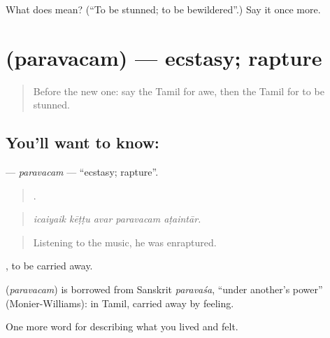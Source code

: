 \begin{tcolorbox}[breakable,colback=teal!4,colframe=teal!35!black,title={Before you move on}]
What does  mean? (\textquotedblleft{}To be stunned; to be bewildered\textquotedblright{}.) Say it once more.
\end{tcolorbox}
\section[\texorpdfstring{\ta{பரவசம்} (paravacam)}{பரவசம் (paravacam)}]{ (paravacam) — ecstasy; rapture}

\label{lesson:TA-C460-paravacam}



\begin{quote}
Before the new one: say the Tamil for awe, then the Tamil for to be stunned.
\end{quote}

\subsection*{You'll want to know: }
\textbf{} — \emph{paravacam} — \textquotedblleft{}ecstasy; rapture\textquotedblright{}.

\begin{quote}
    .
\end{quote}

\begin{quote}
\emph{icaiyaik kēṭṭu avar paravacam aṭaintār.}
\end{quote}

\begin{quote}
Listening to the music, he was enraptured.
\end{quote}

 , to be carried away.

\begin{cousinweb}
\textbf{} (\emph{paravacam}) is borrowed from Sanskrit \emph{paravaśa}, \textquotedblleft{}under another's power\textquotedblright{} (Monier-Williams): in Tamil, carried away by feeling.
\end{cousinweb}

\begin{grammarlens}[title={What you've built}]
One more word for describing what you lived and felt.
\end{grammarlens}

